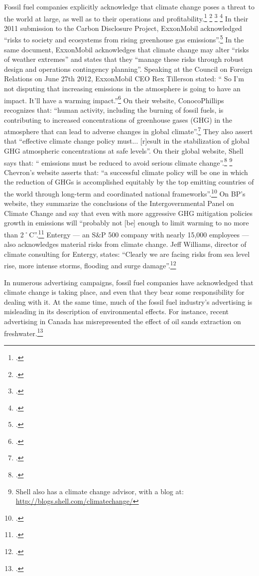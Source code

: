 Fossil fuel companies explicitly acknowledge that climate change poses a threat to the world at large, as well as to their operations and profitability.\footcite[][]{FFcorpsPlanning} \footcite[][]{OilCosFearFI} \footcite[][]{DemiseOfCrudeDenial} \footcite[][]{DoTheOpposite}
In their 2011 submission to the Carbon Disclosure Project, ExxonMobil acknowledged ``risks to society and ecosystems from rising greenhouse gas emissions''.\footcite[][]{ExxonCDP2011}
In the same document, ExxonMobil acknowledges that climate change may alter ``risks of weather extremes'' and states that they ``manage these risks through robust design and operations contingency planning''.
Speaking at the Council on Foreign Relations on June 27th 2012, ExxonMobil CEO Rex Tillerson stated: `` So I'm not disputing that increasing  emissions in the atmosphere is going to have an impact. It'll have a warming impact.''\footcite[][]{Tillerson}
On their website, ConocoPhillips recognizes that: ``human activity, including the burning of fossil fuels, is contributing to increased concentrations of greenhouse gases (GHG) in the atmosphere that can lead to adverse changes in global climate''.\footcite[][]{ConocoPhillipsCC}
They also assert that ``effective climate change policy must... [r]esult in the stabilization of global GHG atmospheric concentrations at safe levels''.
On their global website, Shell says that: `` emissions must be reduced to avoid serious climate change''.\footcite[][]{ShellClimateChange} \footnote{Shell also has a climate change advisor, with a blog at: \url{http://blogs.shell.com/climatechange/}}
Chevron's website asserts that: ``a successful climate policy will be one in which the reduction of GHGs is accomplished equitably by the top emitting countries of the world through long-term and coordinated national frameworks''.\footcite[][]{}
On BP's website, they summarize the conclusions of the Intergovernmental Panel on Climate Change and say that even with more aggressive GHG mitigation policies growth in  emissions will ``probably not [be] enough to limit warming to no more than 2˚C''.\footcite[][]{BPClimateChange}
Entergy --- an S\&P 500 company with nearly 15,000 employees --- also acknowledges material risks from climate change.
Jeff Williams, director of climate consulting for Entergy, states: ``Clearly we are facing risks from sea level rise, more intense storms, flooding and surge damage''.\footcite[][]{ShiftToClimatePreparedness}


In numerous advertising campaigns, fossil fuel companies have acknowledged that climate change is taking place, and even that they bear some responsibility for dealing with it.
At the same time, much of the fossil fuel industry's advertising is misleading in its description of environmental effects.
For instance, recent advertising in Canada has misrepresented the effect of oil sands extraction on freshwater.\footcite[][]{PembinaOilAds}


